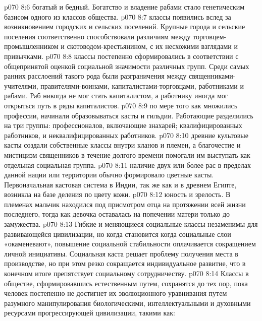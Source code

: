 \vs p070 8:6 \bibnobreakspace {} богатый и бедный. Богатство и владение рабами стало генетическим базисом одного из классов общества.
\vs p070 8:7 \bibnobreakspace {} классы появились вслед за возникновением городских и сельских поселений. Крупные города и сельские поселения соответственно способствовали различиям между торговцем\hyp{}промышленником и скотоводом\hyp{}крестьянином, с их несхожими взглядами и привычками.
\vs p070 8:8 \bibnobreakspace {} классы постепенно сформировались в соответствии с общепринятой оценкой социальной значимости различных групп. Среди самых ранних расслоений такого рода были разграничения между священниками\hyp{}учителями, правителями\hyp{}воинами, капиталистами\hyp{}торговцами, работниками и рабами. Раб никогда не мог стать капиталистом, а работнику иногда мог открыться путь в ряды капиталистов.
\vs p070 8:9 \bibnobreakspace {} по мере того как множились профессии, начинали образовываться касты и гильдии. Работающие разделились на три группы: профессионалов, включающие знахарей; квалифицированных работников, и неквалифицированных работников.
\vs p070 8:10 \bibnobreakspace {} древние культовые касты создали собственные классы внутри кланов и племен, а благочестие и мистицизм священников в течение долгого времени помогали им выступать как отдельная социальная группа.
\vs p070 8:11 \bibnobreakspace {} наличие двух или более рас в пределах данной нации или территории обычно формировало цветные касты. Первоначальная кастовая система в Индии, так же как и в древнем Египте, возникла на базе деления по цвету кожи.
\vs p070 8:12 \bibnobreakspace {} юность и зрелость. В племенах мальчик находился под присмотром отца на протяжении всей жизни последнего, тогда как девочка оставалась на попечении матери только до замужества.
\vs p070 8:13 \pc Гибкие и меняющиеся социальные классы незаменимы для развивающейся цивилизации, но когда  становится  когда социальные слои «окаменевают», повышение социальной стабильности оплачивается сокращением личной инициативы. Социальная каста решает проблему получения места в производстве, но при этом резко сокращается индивидуальное развитие, что в конечном итоге препятствует социальному сотрудничеству.
\vs p070 8:14 Классы в обществе, сформировавшись естественным путем, сохранятся до тех пор, пока человек постепенно не достигнет их эволюционного уравнивания путем разумного манипулирования биологическими, интеллектуальными и духовными ресурсами прогрессирующей цивилизации, такими как:
